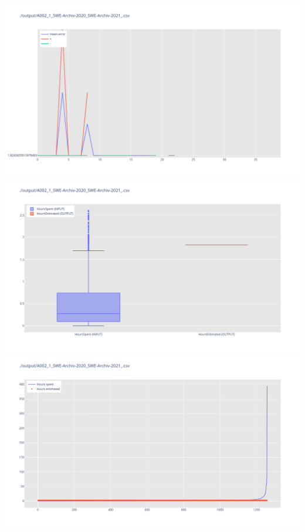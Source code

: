 \includegraphics[width=\textwidth]{Scripts/output/A002_1_SWE-Archiv-2020_SWE-Archiv-2021_.csv.error_distribution.png}
\includegraphics[width=\textwidth]{Scripts/output/A002_1_SWE-Archiv-2020_SWE-Archiv-2021_.csv.png}
\includegraphics[width=\textwidth]{Scripts/output/A002_1_SWE-Archiv-2020_SWE-Archiv-2021_.csv.scatter.png}

